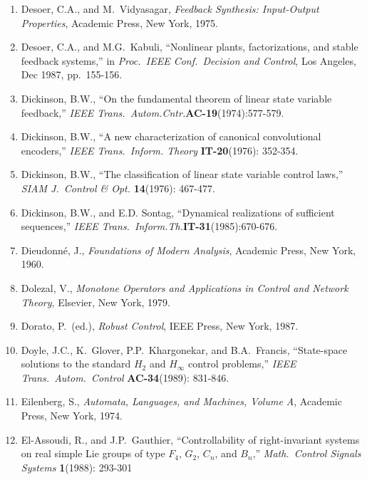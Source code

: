\begin{enumerate}
\item
Desoer, C.A., and M.\ Vidyasagar, {\it Feedback Synthesis: Input-Output
Properties}, Academic Press, New York, 1975.

\item
Desoer, C.A., and M.G.\ Kabuli, ``Nonlinear plants, factorizations, and stable
feedback systems,'' in {\it Proc.\ IEEE Conf.\ Decision and Control}, Los
Angeles, Dec 1987, pp.\ 155-156.

\item
Dickinson, B.W., ``On the fundamental theorem of linear state variable
feedback,'' {\it IEEE Trans.\ Autom.Cntr.}{\bf AC-19}(1974):577-579.

\item
Dickinson, B.W., ``A new characterization of canonical convolutional
encoders,'' {\it IEEE Trans.\ Inform. Theory} {\bf IT-20}(1976): 352-354.

\item
Dickinson, B.W., ``The classification of linear state variable control laws,''
{\it SIAM J.\ Control \& Opt.} {\bf 14}(1976): 467-477.

\item
Dickinson, B.W., and E.D. Sontag, ``Dynamical realizations of sufficient
sequences,'' {\it IEEE Trans.\ Inform.Th.}{\bf IT-31}(1985):670-676.

\item
Dieudonn\'e, J., {\it Foundations of Modern Analysis}, Academic Press, New
York, 1960.

\item
Dolezal, V., {\it Monotone Operators and Applications in Control and Network
Theory}, Elsevier, New York, 1979.

\item
Dorato, P.\ (ed.), {\it Robust Control}, IEEE Press, New York, 1987.

\item
Doyle, J.C., K.\ Glover, P.P.\ Khargonekar, and B.A.\ Francis, ``State-space
solutions to the standard $H_2$ and $H_\infty$ control problems,'' {\it IEEE
Trans.\ Autom.\ Control} {\bf AC-34}(1989): 831-846.

\item
Eilenberg, S., {\it Automata, Languages, and Machines, Volume A}, Academic
Press, New York, 1974.

\item
El-Assoudi, R., and J.P.\ Gauthier, ``Controllability of right-invariant
systems on real simple Lie groups of type $F_4$, $G_2$, $C_n$, and $B_n$,''
{\it Math.\ Control Signals Systems} {\bf 1}(1988): 293-301


\end{enumerate}
